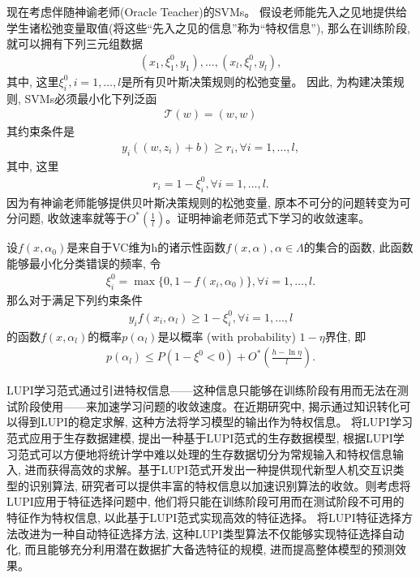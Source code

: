 现在考虑伴随神谕老师(Oracle Teacher)的SVMs。 假设老师能先入之见地提供给学生诸松弛变量取值(将这些“先入之见的信息”称为“特权信息”\citep{Husser1928,Husser1948-en}), 那么在训练阶段, 就可以拥有下列三元组数据
\begin{align}
(x_{1}, \xi_{1}^{0}, y_{1}), \ldots, (x_{l}, \xi_{l}^{0}, y_{l}),
\end{align}
其中, 这里$\xi_{i}^{0}, i = 1, \ldots, l$是所有贝叶斯决策规则的松弛变量。 因此, 为构建决策规则, SVMs必须最小化下列泛函
\begin{align}
\mathcal{T}(w) = (w, w)
\end{align}
其约束条件是
\begin{align}
y_{i}((w, z_{i}) + b) \geq r_{i}, \forall i = 1, \ldots, l,
\end{align}
其中, 这里
\begin{align}
r_{i} = 1 - \xi_{i}^{0}, \forall i = 1, \ldots, l.
\end{align}
因为有神谕老师能够提供贝叶斯决策规则的松弛变量, 原本不可分的问题转变为可分问题, 收敛速率就等于$O^{*}(\frac{1}{l})$。\citet{Vapnik2009}证明神谕老师范式下学习的收敛速率。
\begin{proposition}\citep{Vapnik2009}
设$f(x, \alpha_{0})$是来自于VC维为h的诸示性函数$f(x,\alpha), \alpha \in \Lambda$的集合的函数, 此函数能够最小化分类错误的频率, 令
\begin{align}
\xi_{i}^{0} = \max \{0, 1-f(x_{i}, \alpha_{0})\}, \forall i = 1, \ldots, l.
\end{align}
那么对于满足下列约束条件
\begin{align}
y_{i}f(x_{i}, \alpha_{l}) \geq 1 - \xi_{i}^{0}, \forall i = 1, \ldots, l
\end{align}
的函数$f(x, \alpha_{l})$的概率$p(\alpha_{l})$是以概率 (with probability) $1 - \eta$界住, 即
\begin{align}
p(\alpha_{l}) \leq P(1 - \xi^{0} < 0) + O^{*}\left( \frac{h - \ln \eta}{l}\right).
\end{align}
\end{proposition}

LUPI学习范式通过引进特权信息——这种信息只能够在训练阶段有用而无法在测试阶段使用——来加速学习问题的收敛速度。在近期研究中, \citet{Vapnik-similary-2015,vapnik2015}揭示通过知识转化可以得到LUPI的稳定求解, 这种方法将学习模型的输出作为特权信息。\citet{Shiao2014} 将LUPI学习范式应用于生存数据建模, 提出一种基于LUPI范式的生存数据模型, 根据LUPI学习范式可以方便地将统计学中难以处理的生存数据切分为常规输入和特权信息输入, 进而获得高效的求解。\citet{Vrigkas2017}基于LUPI范式开发出一种提供现代新型人机交互识类型的识别算法, 研究者可以提供丰富的特权信息以加速识别算法的收敛。\citet{Izmailov2017}则考虑将LUPI应用于特征选择问题中, 他们将只能在训练阶段可用而在测试阶段不可用的特征作为特权信息, 以此基于LUPI范式实现高效的特征选择。 \citet{Izmailov2018} 将LUPI特征选择方法改进为一种自动特征选择方法, 这种LUPI类型算法不仅能够实现特征选择自动化, 而且能够充分利用潜在数据扩大备选特征的规模, 进而提高整体模型的预测效果。

